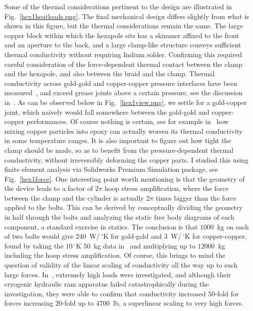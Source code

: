 Some of the thermal considerations pertinent to the design are illustrated in Fig.~\ref{hex1heatloads.png}.
The final mechanical design differs slightly from what is shown in this figure, but the thermal considerations remain the same.
The large copper block within which the hexapole sits has a skimmer affixed to the front and an aperture to the back, and a large clamp-like structure conveys sufficient thermal conductivity without requiring Indium solder.
Confirming this required careful consideration of the force-dependent thermal contact between the clamp and the hexapole, and also between the braid and the clamp.
Thermal conductivity across gold-gold and copper-copper pressure interfaces have been measured~\citep[Fig.~2.7]{Ekin2006}, and exceed grease joints above a certain pressure, see the discussion in~\citep[Sec.~2.6.4]{Ekin2006}.
As can be observed below in Fig.~\ref{hex1view.png}, we settle for a gold-copper joint, which naively would fall somewhere between the gold-gold and copper-copper performances.
Of course nothing is certain, see for example in~\citep[Fig.~5.8]{Hartwig2013} how mixing copper particles into epoxy can actually worsen its thermal conductivity in some temperature ranges.
It is also important to figure out how tight the clamp should be made, so as to benefit from the pressure-dependent thermal conductivity, without irreversibly deforming the copper parts.
I studied this using finite element analysis via Solidworks Premium Simulation package, see Fig.~\ref{hex1force}.
One interesting point worth mentioning is that the geometry of the device leads to a factor of $2\pi$ hoop stress amplification, where the force between the clamp and the cylinder is actually $2\pi$ times bigger than the force applied to the bolts.
This can be derived by conceptually dividing the geometry in half through the bolts and analyzing the static free body diagrams of each component, a standard exercise in statics.
The conclusion is that $1000$~kg on each of two bolts would give $240$~W/\,$^\circ$K for gold-gold and $3$~W/\,$^\circ$K for copper-copper, found by taking the $10\,^\circ$K $50$~kg data in~\citep[Fig.~5.8]{Hartwig2013} and multiplying up to $12000$~kg including the hoop stress amplification.
Of course, this brings to mind the question of validity of the linear scaling of conductivity all the way up to such large forces.
In~\cite{Berman1956}, extremely high loads were investigated, and although their cryogenic hydraulic ram apparatus failed catastrophically during the investigation, they were able to confirm that conductivity increased $5$0-fold for forces increasing $20$-fold up to $4700$~lb, a superlinear scaling to very high forces.

